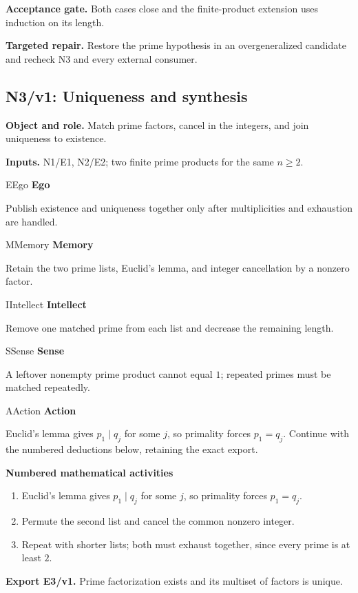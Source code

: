 \documentclass[preprint,12pt,aps,pra,showkeys,amsmath,amssymb,superscriptaddress,floatfix]{revtex4-2}
\theoremstyle{definition}
\theoremstyle{remark}
\newcommand{\mmfaculty}[3]{%
 \begin{mmfacultybox}{#1}{#2}
 {\sffamily\bfseries\color{MMBlue}#2}\par\smallskip #3
 \end{mmfacultybox}}
\newcommand{\field}[2]{\par\smallskip\noindent\textbf{#1.} #2\par}
\begin{document}
\field{Acceptance gate}{Both cases close and the finite-product extension uses induction on its
length.}

\field{Targeted repair}{Restore the prime hypothesis in an overgeneralized candidate and recheck
N3 and every external consumer.}

\clearpage

\subsection{N3/v1: Uniqueness and synthesis}

\field{Object and role}{Match prime factors, cancel in the integers, and join uniqueness to
existence.}

\field{Inputs}{N1/E1, N2/E2; two finite prime products for the same \(n\ge2\).}

\mmfaculty{E}{Ego}{Publish existence and uniqueness together only after multiplicities and
exhaustion are handled.}

\mmfaculty{M}{Memory}{Retain the two prime lists, Euclid's lemma, and integer cancellation by
a nonzero factor.}

\mmfaculty{I}{Intellect}{Remove one matched prime from each list and decrease the remaining
length.}

\mmfaculty{S}{Sense}{A leftover nonempty prime product cannot equal \(1\); repeated primes
must be matched repeatedly.}

\mmfaculty{A}{Action}{Euclid's lemma gives \(p_1\mid q_j\) for some \(j\), so primality forces
\(p_1=q_j\). Continue with the numbered deductions below, retaining the
exact export.}

\smallskip\noindent\textbf{Numbered mathematical activities}

\begin{enumerate}[label=N3.\arabic*,leftmargin=3.4em]

\item Euclid's lemma gives \(p_1\mid q_j\) for some \(j\), so primality forces
\(p_1=q_j\).

\item Permute the second list and cancel the common nonzero integer.

\item Repeat with shorter lists; both must exhaust together, since every prime
is at least \(2\).

\end{enumerate}

\field{Export E3/v1}{Prime factorization exists and its multiset of factors is unique.}
\end{document}
